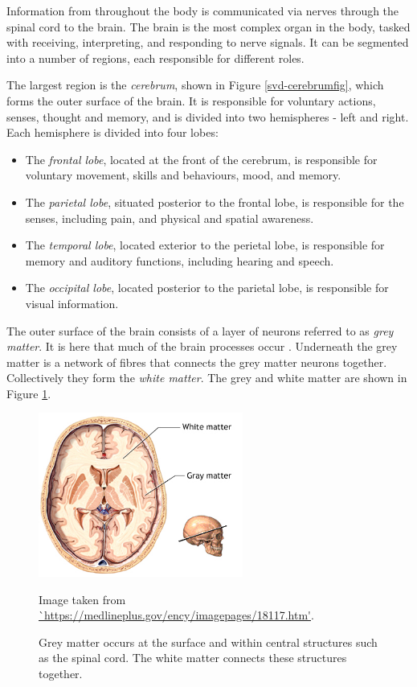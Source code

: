 Information from throughout the body is communicated via nerves through the spinal cord to the brain. The brain is the most complex organ in the body, tasked with receiving, interpreting, and responding to nerve signals. It can be segmented into a number of regions, each responsible for different roles.

The largest region is the \textit{cerebrum}, shown in Figure \ref{svd-cerebrumfig}, which forms the outer surface of the brain. It is responsible for voluntary actions, senses, thought and memory, and is divided into two hemispheres - left and right. Each hemisphere is divided into four lobes:
 \begin{itemize}
	\item The \textit{frontal lobe}, located at the front of the cerebrum, is responsible for voluntary movement, skills and behaviours, mood, and memory.
	\item The \textit{parietal lobe}, situated posterior to the frontal lobe, is responsible for the senses, including pain, and physical and spatial awareness.
	\item The \textit{temporal lobe}, located exterior to the perietal lobe, is responsible for memory and auditory functions, including hearing and speech.
	\item The \textit{occipital lobe}, located posterior to the parietal lobe, is responsible for visual information.
\end{itemize}

The outer surface of the brain consists of a layer of neurons referred to as \textit{grey matter}. It is here that much of the brain processes occur \citep{Dafny1997}. Underneath the grey matter is a network of fibres that connects the grey matter neurons together. Collectively they form the \textit{white matter}. The grey and white matter are shown in Figure \ref{svd-greywhitefig}.

\begin{figure}[ht]
	\centering
	\includegraphics[width=0.6\textwidth]{Images/2_white_vs_grey.png}
	\caption{Grey matter occurs at the surface and within central structures such as the spinal cord. The white matter connects these structures together.}
	\small Image taken from \url{`https://medlineplus.gov/ency/imagepages/18117.htm'}.
	\label{svd-greywhitefig}
\end{figure}

